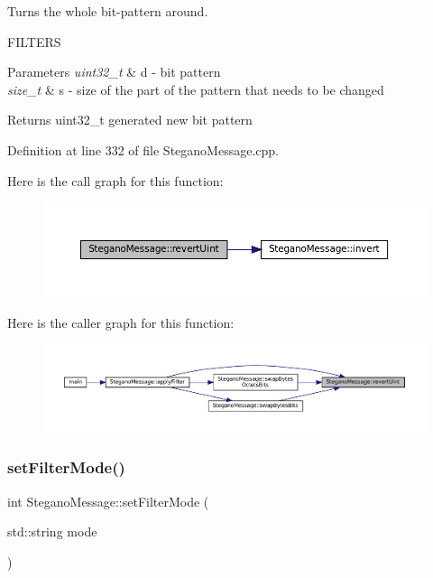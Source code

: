 Turns the whole bit-\/pattern around. 

F\+I\+L\+T\+E\+RS
\begin{DoxyParams}{Parameters}
{\em uint32\+\_\+t} & d -\/ bit pattern \\
\hline
{\em size\+\_\+t} & s -\/ size of the part of the pattern that needs to be changed \\
\hline
\end{DoxyParams}
\begin{DoxyReturn}{Returns}
uint32\+\_\+t generated new bit pattern 
\end{DoxyReturn}


Definition at line 332 of file Stegano\+Message.\+cpp.

Here is the call graph for this function\+:\nopagebreak
\begin{figure}[H]
\begin{center}
\leavevmode
\includegraphics[width=350pt]{classSteganoMessage_a28fdc9b9da4cbbffed718d351da65fd3_cgraph}
\end{center}
\end{figure}
Here is the caller graph for this function\+:\nopagebreak
\begin{figure}[H]
\begin{center}
\leavevmode
\includegraphics[width=350pt]{classSteganoMessage_a28fdc9b9da4cbbffed718d351da65fd3_icgraph}
\end{center}
\end{figure}
\mbox{\label{classSteganoMessage_a5c3ef910b17f4bbe32a73a33be9d7586}} 
\subsubsection{\texorpdfstring{setFilterMode()}{setFilterMode()}}
{\footnotesize\ttfamily int Stegano\+Message\+::set\+Filter\+Mode (\begin{DoxyParamCaption}\item[{std\+::string}]{mode }\end{DoxyParamCaption})}



